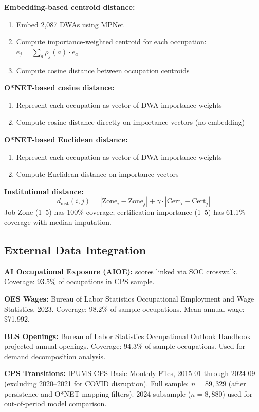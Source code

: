 \documentclass[12pt]{article}
\begin{document}
\textbf{Embedding-based centroid distance:}
\begin{enumerate}
    \item Embed 2,087 DWAs using MPNet
    \item Compute importance-weighted centroid for each occupation: $\bar{e}_j = \sum_a \rho_j(a) \cdot e_a$
    \item Compute cosine distance between occupation centroids
\end{enumerate}

\textbf{O*NET-based cosine distance:}
\begin{enumerate}
    \item Represent each occupation as vector of DWA importance weights
    \item Compute cosine distance directly on importance vectors (no embedding)
\end{enumerate}

\textbf{O*NET-based Euclidean distance:}
\begin{enumerate}
    \item Represent each occupation as vector of DWA importance weights
    \item Compute Euclidean distance on importance vectors
\end{enumerate}

\textbf{Institutional distance:}
\[
d_{\mathrm{inst}}(i,j) = |\mathrm{Zone}_i - \mathrm{Zone}_j| + \gamma \cdot |\mathrm{Cert}_i - \mathrm{Cert}_j|
\]
Job Zone (1--5) has 100\% coverage; certification importance (1--5) has 61.1\% coverage with median imputation.


\subsection{External Data Integration}
\label{subsec:external-data}


\textbf{AI Occupational Exposure (AIOE):} \citet{FeltenRajSeamans2021} scores linked via SOC crosswalk. Coverage: 93.5\% of occupations in CPS sample.

\textbf{OES Wages:} Bureau of Labor Statistics Occupational Employment and Wage Statistics, 2023. Coverage: 98.2\% of sample occupations. Mean annual wage: \$71,992.

\textbf{BLS Openings:} Bureau of Labor Statistics Occupational Outlook Handbook projected annual openings. Coverage: 94.3\% of sample occupations. Used for demand decomposition analysis.

\textbf{CPS Transitions:} IPUMS CPS Basic Monthly Files, 2015-01 through 2024-09 (excluding 2020--2021 for COVID disruption). Full sample: $n = 89{,}329$ (after persistence and O*NET mapping filters). 2024 subsample ($n = 8{,}880$) used for out-of-period model comparison.
\end{document}

